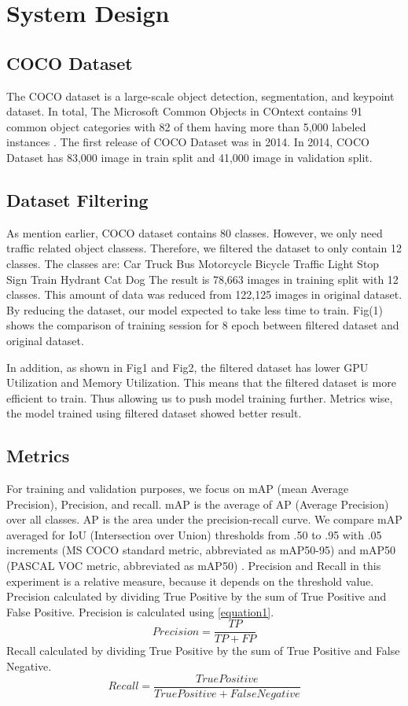 \documentclass[conference]{IEEEtran}
\begin{document}
\section{System Design}

\subsection{COCO Dataset}\label{AA}
The COCO dataset is a large-scale object detection, segmentation, and keypoint dataset.
In total, The Microsoft Common Objects in COntext contains 91 common object categories with 82 of them having more than 5,000 labeled instances \cite{b6}.
The first release of COCO Dataset was in 2014. In 2014, COCO Dataset has 83,000 image in train split and 41,000 image in validation split. 


\subsection{Dataset Filtering}
\label{Filtering}
As mention earlier, COCO dataset contains 80 classes. However, we only need traffic related object classess.
Therefore, we filtered the dataset to only contain 12 classes. The classes are:
Car Truck Bus Motorcycle Bicycle Traffic Light Stop Sign Train Hydrant Cat Dog
The result is 78,663 images in training split with 12 classes. This amount of data was reduced from 122,125 images in original dataset. By reducing the dataset, our model expected to take less time to train.
Fig(1) shows the comparison of training session for 8 epoch between filtered dataset and original dataset.
\begin{figure}

\end{figure}

In addition, as shown in Fig1 and Fig2, the filtered dataset has lower GPU Utilization and Memory Utilization. This means that the filtered dataset is more efficient to train.
Thus allowing us to push model training further.
Metrics wise, the model trained using filtered dataset showed better result.


\subsection{Metrics}
For training and validation purposes, we focus on mAP (mean Average Precision), Precision, and recall. mAP is the average of AP (Average Precision) over all classes. AP is the area under the precision-recall curve.
We compare mAP averaged for IoU (Intersection over Union) thresholds from .50 to .95 with .05 increments (MS COCO standard metric, abbreviated as mAP50-95) and mAP50 (PASCAL VOC metric, abbreviated as mAP50) \cite{b7}. 
Precision and Recall in  this experiment is a relative measure, because it depends on the threshold value.
Precision calculated by dividing True Positive by the sum of True Positive and False Positive. 
Precision is calculated using \eqref{equation1}.
\begin{equation}
Precision = \frac{TP}{TP+FP}
\label{equation1}
\end{equation}
Recall calculated by dividing True Positive by the sum of True Positive and False Negative.
\[Recall = \frac{True Positive}{TruePositive+FalseNegative}\]
\end{document}
